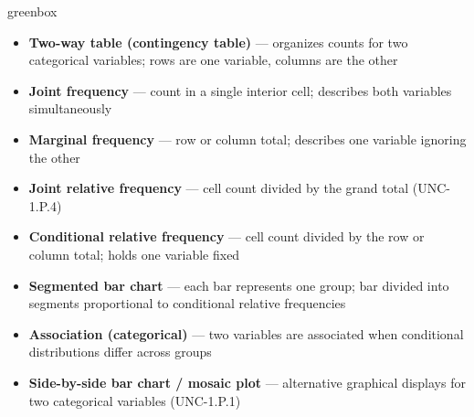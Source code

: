 \documentclass[10pt]{article}
\begin{document}
\begin{skillbox}{greenbox}
\begin{minipage}[t]{0.48\linewidth}
    \begin{itemize}
        \item \textbf{Two-way table (contingency table)} --- organizes counts for two
              categorical variables; rows are one variable, columns are the other
        \item \textbf{Joint frequency} --- count in a single interior cell; describes
              both variables simultaneously
        \item \textbf{Marginal frequency} --- row or column total; describes one
              variable ignoring the other
        \item \textbf{Joint relative frequency} --- cell count divided by the grand
              total (UNC-1.P.4)
    \end{itemize}
\end{minipage}
\hfill
\begin{minipage}[t]{0.48\linewidth}
    \begin{itemize}
        \item \textbf{Conditional relative frequency} --- cell count divided by the
              row or column total; holds one variable fixed
        \item \textbf{Segmented bar chart} --- each bar represents one group; bar
              divided into segments proportional to conditional relative frequencies
        \item \textbf{Association (categorical)} --- two variables are associated when
              conditional distributions differ across groups
        \item \textbf{Side-by-side bar chart / mosaic plot} --- alternative graphical
              displays for two categorical variables (UNC-1.P.1)
    \end{itemize}
\end{minipage}
\end{skillbox}
\end{document}
